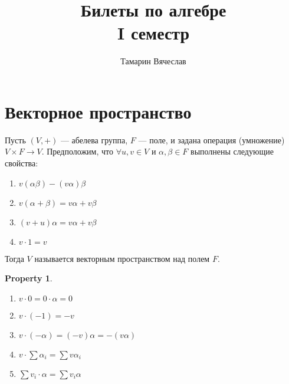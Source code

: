 \documentclass[11pt]{book}
\title{Билеты по алгебре \\ I семестр}
\author{Тамарин Вячеслав}
\theoremstyle{definition}
\theoremstyle{plain}
\theoremstyle{plain}
\newtheorem*{prop}{Property}
\theoremstyle{definition}
\theoremstyle{remark}
\begin{document}
\maketitle
\tableofcontents

\section{Векторное пространство}
\begin{defn}
    Пусть $ (V, +)$ --- абелева группа,  $ F$ --- поле, и задана операция (умножение)  $ V \times F \to  V$. Предположим, что $ \forall  u, v \in V $ и $ \alpha, \beta \in F$ выполнены следующие свойства:
    \begin{enumerate}[noitemsep]
	\item  $ v(\alpha \beta) - (v\alpha)\beta$
	\item  $ v(\alpha+\beta) = v\alpha + v\beta$
	\item  $ (v+u)\alpha = v\alpha+v\beta$
	\item  $ v \cdot 1 = v$
    \end{enumerate}
    Тогда $ V$ называется {\sf векторным пространством} над полем  $ F$.
\end{defn}
\begin{prop}
    $ $
    \begin{enumerate}[noitemsep]
	\item $ v \cdot 0 = 0 \cdot \alpha  = 0$
	\item $ v \cdot (-1) = -v$
	\item $ v \cdot (-\alpha) = (-v)\alpha = - (v \alpha)$
	\item $v \cdot \sum \alpha_i = \sum v\alpha_i$
	\item $ \sum v_i \cdot \alpha = \sum v_i\alpha$
    \end{enumerate}
\end{prop}
\end{document}

